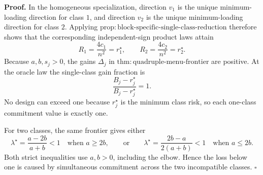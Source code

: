 \textbf{Proof.}
In the homogeneous specialization, direction \(v_1\) is the unique minimum-loading direction for class \(1\), and direction \(v_2\) is the unique minimum-loading direction for class \(2\).  Applying \(\mathrm{prop:block\text{-}specific\text{-}single\text{-}class\text{-}reduction}\) therefore shows that the corresponding independent-sign product laws attain
\[
R_1=\frac{4c_1}{n^2}=r_1^\star,
\qquad
R_2=\frac{4c_2}{n^2}=r_2^\star.
\tag{1}
\]
Because \(a,b,s_j>0\), the gains \(\Delta_j\) in \(\mathrm{thm:quadruple\text{-}menu\text{-}frontier}\) are positive.  At the oracle law the single-class gain fraction is
\[
\frac{B_j-r_j^\star}{B_j-r_j^\star}=1.
\tag{2}
\]
No design can exceed one because \(r_j^\star\) is the minimum class risk, so each one-class commitment value is exactly one.

For two classes, the same frontier gives either
\[
\lambda^\star=\frac{a-2b}{a+b}<1
\quad\text{when }a\ge2b,
\qquad\text{or}\qquad
\lambda^\star=\frac{2b-a}{2(a+b)}<1
\quad\text{when }a\le2b.
\tag{3}
\]
Both strict inequalities use \(a,b>0\), including the elbow.  Hence the loss below one is caused by simultaneous commitment across the two incompatible classes.  \(\square\)